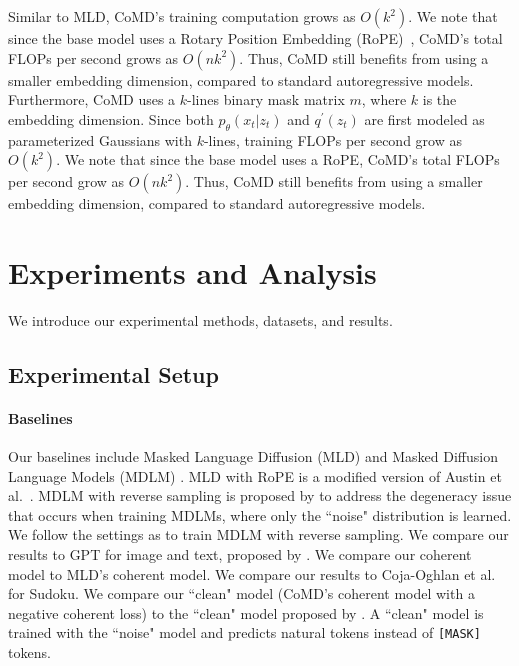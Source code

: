 \documentclass{article} %
\begin{document}
Similar to MLD, CoMD's training computation grows as $O(k^2)$. We note that since the base model uses a Rotary Position Embedding (RoPE)~\citep{jian2024roformer}, CoMD's total FLOPs per second grows as $O(nk^2)$. Thus, CoMD still benefits from using a smaller embedding dimension, compared to standard autoregressive models. Furthermore, CoMD uses a $k$-lines binary mask matrix $m$, where $k$ is the embedding dimension. Since both $p_\theta(x_t|z_t)$ and $q^\prime(z_t)$ are first modeled as parameterized Gaussians with $k$-lines, training FLOPs per second grow as $O(k^2)$. We note that since the base model uses a RoPE, CoMD's total FLOPs per second grow as $O(nk^2)$. Thus, CoMD still benefits from using a smaller embedding dimension, compared to standard autoregressive models. 




\section{Experiments and Analysis}

We introduce our experimental methods, datasets, and results.
\subsection{Experimental Setup}

\paragraph{Baselines} Our baselines include Masked Language Diffusion (MLD) \citep{austin2023structured} and Masked Diffusion Language Models (MDLM) \citep{austin2023structured,shih2022training}. MLD with RoPE is a modified version of Austin et al.~\citep{austin2023structured}. MDLM with reverse sampling is proposed by \citet{shih2022training} to address the degeneracy issue that occurs when training MDLMs, where only the ``noise" distribution is learned. We follow the settings as \citet{shih2022training} to train MDLM with reverse sampling. We compare our results to GPT for image and text, proposed by \citet{austin2023structured}. We compare our coherent model to MLD's coherent model. We compare our results to Coja-Oghlan et al.~\citep{coja2020replica} for Sudoku. We compare our ``clean" model (CoMD's coherent model with a negative coherent loss) to the ``clean" model proposed by \citet{shih2022training}. A ``clean" model is trained with the ``noise" model and predicts natural tokens instead of \texttt{[MASK]} tokens.
\end{document}
